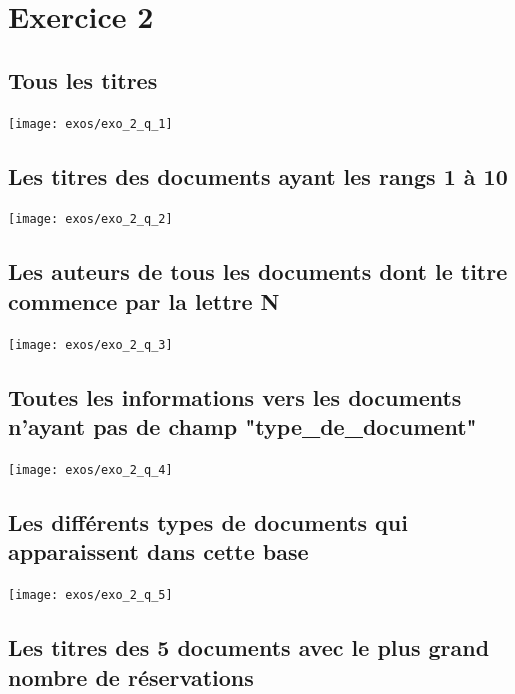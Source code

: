 \documentclass[12pt,a4paper]{article}
\begin{document}
\newpage

\section{Exercice 2}

\subsection{Tous les titres}

\begin{center}
	\texttt{[image: exos/exo\_2\_q\_1]}
\end{center}

\subsection{Les titres des documents ayant les rangs 1 à 10}

\begin{center}
	\texttt{[image: exos/exo\_2\_q\_2]}
\end{center}

\subsection{Les auteurs de tous les documents dont le titre commence par la lettre N}

\begin{center}
	\texttt{[image: exos/exo\_2\_q\_3]}
\end{center}

\subsection{Toutes les informations vers les documents n'ayant pas de champ "type\_de\_document"}

\begin{center}
	\texttt{[image: exos/exo\_2\_q\_4]}
\end{center}

\subsection{Les différents types de documents qui apparaissent dans cette base}

\begin{center}
	\texttt{[image: exos/exo\_2\_q\_5]}
\end{center}

\subsection{Les titres des 5 documents avec le plus grand nombre de réservations}
\end{document}
